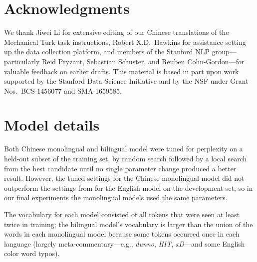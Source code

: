 \documentclass[11pt,a4paper]{article}
\renewcommand{\|}{\mid}
\newcommand{\word}[1]{\emph{#1}}
\begin{document}
\section*{Acknowledgments}

We thank Jiwei Li for extensive editing of our Chinese translations of the Mechanical Turk task instructions, Robert X.D.\ Hawkins for assistance setting up the data collection platform, and members of the Stanford NLP group---particularly Reid Pryzant, Sebastian Schuster, and Reuben Cohn-Gordon---for valuable feedback on earlier drafts. 
This material is based in part upon work supported by the Stanford Data Science Initiative and by the NSF under Grant Nos.~BCS-1456077 and SMA-1659585.




\appendix

\section{Model details} \label{sec:appendix}

Both Chinese monolingual and bilingual model were tuned for perplexity on a held-out subset of the training set,
by random search followed by a local search from the best candidate until no single parameter change produced a better
result. However, the tuned settings for the Chinese monolingual model did not outperform the settings from
\citet{Monroe2017} for the English model on the development set, so in our final experiments the monolingual models
used the same parameters.

The vocabulary for each model consisted of all tokens that were seen at least twice in training; the bilingual
model's vocabulary is larger than the union of the words in each monolingual model because some tokens occurred once in each language
(largely meta-commentary---e.g., \word{dunno}, \word{HIT}, \word{xD}---and some English color word typos).
\end{document}
